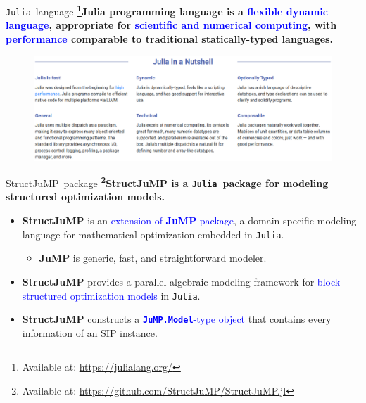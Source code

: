 \documentclass{beamer}
\newcommand{\jump}{\textsf{JuMP}}
\newcommand{\structjump}{\textsf{StructJuMP}}
\newcommand{\julia}{\texttt{Julia}}
\newcommand{\jumpmodel}{\texttt{JuMP.Model}}
\begin{document}
\begin{frame}{\julia\ language}
\textbf{\footnote{\tiny Available at: \href{https://julialang.org /}{https://julialang.org/}}{Julia programming language} is a \textcolor{blue}{flexible dynamic language}, appropriate for \textcolor{blue}{scientific and numerical computing}, with \textcolor{blue}{performance} comparable to traditional statically-typed languages.} 
\begin{figure}
\begin{center}
\includegraphics[width=\textwidth]{julia_nutshell}
\end{center}
\end{figure}	
\end{frame}

\begin{frame}{\structjump\ package}
\textbf{\footnote{\tiny Available at: \href{https://github.com/StructJuMP/StructJuMP.jl}{https://github.com/StructJuMP/StructJuMP.jl}}{\structjump} is a \julia\ package for modeling structured optimization models.}
\begin{itemize}
\item \textbf{\structjump} is an \textcolor{blue}{extension of \textbf{\jump} package}, a domain-specific modeling language for mathematical optimization embedded in \julia.
\begin{itemize}
\item \textbf{\jump} is generic, fast, and straightforward modeler.
\end{itemize}
\item \textbf{\structjump} provides a parallel algebraic modeling framework for \textcolor{blue}{block-structured optimization models} in \julia.
\item \textbf{\structjump} constructs a \textcolor{blue}{\textbf{\jumpmodel}-type object} that contains every information of an SIP instance.
\end{itemize}
\end{frame}
\end{document}
